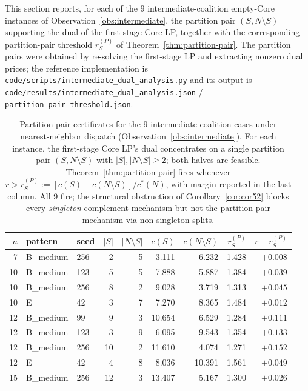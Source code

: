 \documentclass[11pt]{article}
\newcommand{\cstar}{c^{\ast}}
\theoremstyle{plain}
\theoremstyle{definition}
\theoremstyle{remark}
\begin{document}
This section reports, for each of the 9 intermediate-coalition empty-Core
instances of Observation~\ref{obs:intermediate}, the partition pair
$(S, N\setminus S)$ supporting the dual of the first-stage Core LP, together
with the corresponding partition-pair threshold $r^{(P)}_{S}$ of
Theorem~\ref{thm:partition-pair}. The partition pairs were obtained by
re-solving the first-stage LP and extracting nonzero dual prices; the
reference implementation is
\verb|code/scripts/intermediate_dual_analysis.py| and its output is
\verb|code/results/intermediate_dual_analysis.json| /
\verb|partition_pair_threshold.json|.

\begin{table}[htbp]
\centering
\footnotesize
\caption{Partition-pair certificates for the 9 intermediate-coalition cases under nearest-neighbor dispatch (Observation~\ref{obs:intermediate}). For each instance, the first-stage Core LP's dual concentrates on a single partition pair $(S,N\setminus S)$ with $|S|,|N\setminus S|\ge 2$; both halves are feasible. Theorem~\ref{thm:partition-pair} fires whenever $r > r^{(P)}_{S} := [c(S)+c(N\setminus S)]/\cstar(N)$, with margin reported in the last column. All 9 fire; the structural obstruction of Corollary~\ref{cor:cor52} blocks every \emph{singleton}-complement mechanism but not the partition-pair mechanism via non-singleton splits.}
\label{tab:partition-pair}
\begin{tabular}{@{}rllrrrrrr@{}}
\toprule
$n$ & pattern & seed & $|S|$ & $|N\setminus S|$ & $c(S)$ & $c(N\setminus S)$ & $r^{(P)}_{S}$ & $r-r^{(P)}_{S}$ \\
\midrule
 7 & B\_medium & 256 & 2 &  5 &  3.111 &  6.232 & 1.428 & $+0.008$ \\
10 & B\_medium & 123 & 5 &  5 &  7.888 &  5.887 & 1.384 & $+0.039$ \\
10 & B\_medium & 256 & 8 &  2 &  9.028 &  3.719 & 1.313 & $+0.045$ \\
10 & E         &  42 & 3 &  7 &  7.270 &  8.365 & 1.484 & $+0.012$ \\
12 & B\_medium &  99 & 9 &  3 & 10.654 &  6.529 & 1.284 & $+0.111$ \\
12 & B\_medium & 123 & 3 &  9 &  6.095 &  9.543 & 1.354 & $+0.133$ \\
12 & B\_medium & 256 &10 &  2 & 11.610 &  4.074 & 1.271 & $+0.152$ \\
12 & E         &  42 & 4 &  8 &  8.036 & 10.391 & 1.561 & $+0.049$ \\
15 & B\_medium & 256 &12 &  3 & 13.407 &  5.167 & 1.300 & $+0.026$ \\
\bottomrule
\end{tabular}
\end{table}
\end{document}
